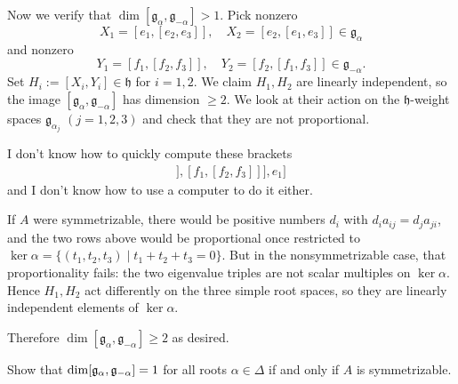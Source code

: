 \documentclass[12pt]{article}
\begin{document}
\begin{solution}[Incomplete]
Now we verify that $\dim [\mathfrak{g}_\alpha,\mathfrak{g}_{-\alpha}]>1$. Pick nonzero
\[
X_1=[e_1,[e_2,e_3]], \quad X_2=[e_2,[e_1,e_3]]\in \mathfrak{g}_\alpha
\]
and nonzero 
\[
Y_1=[f_1,[f_2,f_3]], \quad Y_2=[f_2,[f_1,f_3]]\in \mathfrak{g}_{-\alpha}.
\]
Set
$H_i:=[X_i,Y_i]\in\mathfrak{h}$ for $i=1,2$. We claim $H_1,H_2$ are linearly independent, so the image $[\mathfrak{g}_\alpha,\mathfrak{g}_{-\alpha}]$ has dimension $\geq2$. We look at their action on the $\mathfrak{h}$-weight spaces $\mathfrak{g}_{\alpha_j}$ $(j=1,2,3)$ and check that they are not proportional.

I don't know how to quickly compute these brackets \begin{align*}
    [[[e_1,[e_2,e_3]],[f_1,[f_2,f_3]]],e_1]
\end{align*} and I don't know how to use a computer to do it either. 

If $A$ were symmetrizable, there would be positive numbers $d_i$ with $d_i a_{ij}=d_j a_{ji}$, and the two rows above would be proportional once restricted to $\ker\alpha=\{(t_1,t_2,t_3)\mid t_1+t_2+t_3=0\}$. But in the nonsymmetrizable case, that proportionality fails: the two eigenvalue triples are not scalar multiples on $\ker\alpha$. Hence $H_1,H_2$ act differently on the three simple root spaces, so they are linearly independent elements of $\ker\alpha$.

Therefore
$\dim [\mathfrak{g}_\alpha,\mathfrak{g}_{-\alpha}] \geq 2$ as desired.
\end{solution}

\begin{exercise}
    Show that $\dim [\mathfrak{g}_\alpha,\mathfrak{g}_{-\alpha}] = 1$ for all roots $\alpha \in \Delta$ if and only if $A$ is symmetrizable.
\end{exercise}
\end{document}

